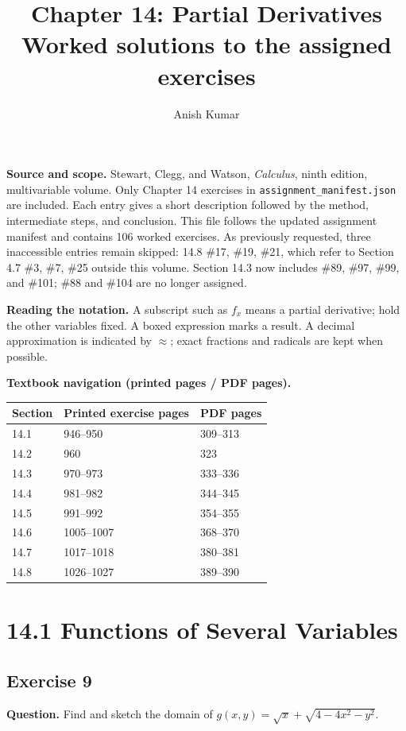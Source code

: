 \documentclass[11pt]{article}
\title{Chapter 14: Partial Derivatives\\Worked solutions to the assigned exercises}
\author{Anish Kumar}\date{}
\newcommand{\ex}[1]{\Needspace{8\baselineskip}\subsection*{Exercise #1}}
\begin{document}
\maketitle
\noindent{}
\medskip

\noindent\textbf{Source and scope.} Stewart, Clegg, and Watson, \emph{Calculus}, ninth edition, multivariable volume. Only Chapter 14 exercises in \texttt{assignment\_manifest.json} are included. Each entry gives a short description followed by the method, intermediate steps, and conclusion. This file follows the updated assignment manifest and contains 106 worked exercises. As previously requested, three inaccessible entries remain skipped: 14.8 \#17, \#19, \#21, which refer to Section 4.7 \#3, \#7, \#25 outside this volume. Section 14.3 now includes \#89, \#97, \#99, and \#101; \#88 and \#104 are no longer assigned.
\medskip

\noindent\textbf{Reading the notation.} A subscript such as $f_x$ means a partial derivative; hold the other variables fixed. A boxed expression marks a result. A decimal approximation is indicated by $\approx$; exact fractions and radicals are kept when possible.
\medskip

\noindent\textbf{Textbook navigation (printed pages / PDF pages).}
\begin{center}\begin{tabular}{lll}\toprule Section & Printed exercise pages & PDF pages\\\midrule
14.1 & 946--950 & 309--313\\
14.2 & 960 & 323\\
14.3 & 970--973 & 333--336\\
14.4 & 981--982 & 344--345\\
14.5 & 991--992 & 354--355\\
14.6 & 1005--1007 & 368--370\\
14.7 & 1017--1018 & 380--381\\
14.8 & 1026--1027 & 389--390\\\bottomrule\end{tabular}\end{center}
\clearpage\tableofcontents
\clearpage\section*{14.1 Functions of Several Variables}
\ex{9}
\textbf{Question.} Find and sketch the domain of $g(x,y)=\sqrt{x}+\sqrt{4-4x^2-y^2}$.
\end{document}
